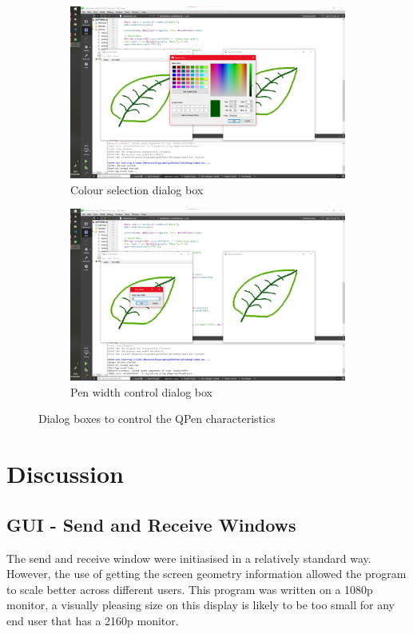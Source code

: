 \documentclass[10pt]{article}
\newcommand{\figsquish}{\vspace{-5mm}} %
\begin{document}
\begin{multicols*}{2}
\begin{figure}[H]
\begin{subfigure}[t]{0.48\columnwidth}
		\includegraphics[width=\columnwidth]{./colour.png}
		\caption{Colour selection dialog box}
		\label{fig:colour}
	\end{subfigure}
	\hfill
	\begin{subfigure}[t]{0.48\columnwidth}

		\includegraphics[width=\columnwidth]{./width.png}
		\caption{Pen width control dialog box}
		\label{fig:width}
	\end{subfigure}
	\caption{Dialog boxes to control the QPen characteristics}
	\label{fig:drawDialogs}
\end{figure}
\figsquish


\section{Discussion}
\subsection{GUI - Send and Receive Windows}
The send and receive window were initiasised in a relatively standard way. However, the use of getting the screen geometry information allowed the program to scale better across different users. This program was written on a 1080p monitor, a visually pleasing size on this display is likely to be too small for any end user that has a 2160p monitor.


\end{multicols*}
\end{document}
